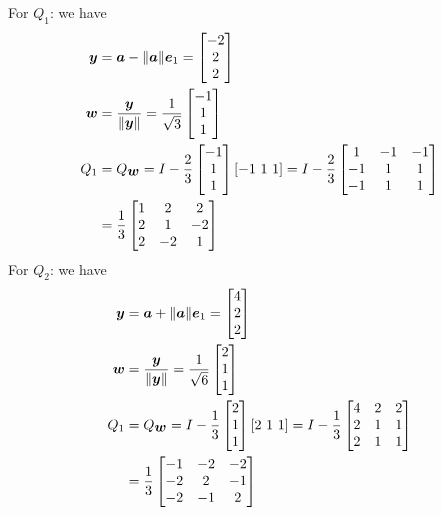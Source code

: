 \documentclass[12pt,a4paper]{article}
\def\a{ {\vc a} }
\def\e{ {\vc e} }
\def\y{ {\vc y} }
\def\w{ {\vc w} }
\begin{document}
For $Q_1$: we have
\begin{align*}
\ensuremath{\bm{\y}} &= \ensuremath{\bm{\a}} - \| \ensuremath{\bm{\a}}\| \ensuremath{\bm{\e}}_1 =  \begin{bmatrix} -2 \\ 2 \\ 2 \end{bmatrix} \\
\ensuremath{\bm{\w}} &= {\ensuremath{\bm{\y}} \over \|\ensuremath{\bm{\y}}\|} = {1 \over \sqrt{3}} \begin{bmatrix} -1 \\ 1 \\ 1 \end{bmatrix} \\
Q_1 &= Q_{\ensuremath{\bm{\w}}} = I - {2 \over 3} \begin{bmatrix} -1 \\ 1 \\ 1 \end{bmatrix}  [-1\ 1\ 1] = 
I - {2 \over 3} \begin{bmatrix} 1 & -1 & -1 \\ -1 & 1 & 1 \\ -1 & 1 & 1 \end{bmatrix} \\
&={1 \over 3} \begin{bmatrix} 1 & 2 & 2 \\ 2 & 1 & -2 \\ 2 & -2 & 1 \end{bmatrix} 
\end{align*}
For $Q_2$: we have
\begin{align*}
\ensuremath{\bm{\y}} &= \ensuremath{\bm{\a}} + \| \ensuremath{\bm{\a}}\| \ensuremath{\bm{\e}}_1 =  \begin{bmatrix} 4 \\ 2 \\ 2 \end{bmatrix} \\
\ensuremath{\bm{\w}} &= {\ensuremath{\bm{\y}} \over \|\ensuremath{\bm{\y}}\|} = {1 \over \sqrt{6}} \begin{bmatrix} 2 \\ 1 \\ 1 \end{bmatrix} \\
Q_1 &= Q_{\ensuremath{\bm{\w}}} = I - {1 \over 3} \begin{bmatrix} 2 \\ 1 \\ 1 \end{bmatrix}  [2\ 1\ 1] = 
I - {1 \over 3} \begin{bmatrix} 4 & 2 & 2 \\ 2 & 1  & 1 \\ 2&  1 & 1 \end{bmatrix} \\
&={1 \over 3} \begin{bmatrix} -1 & -2 & -2 \\ -2& 2 &-1 \\ -2& -1& 2 \end{bmatrix} 
\end{align*}
\end{document}
